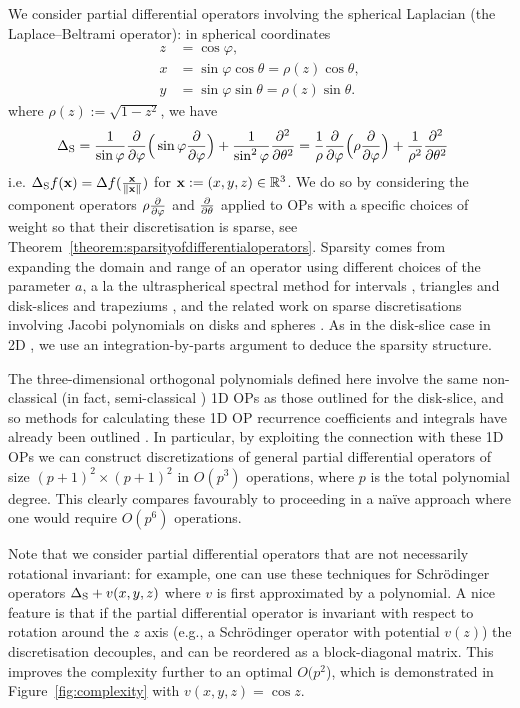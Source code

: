 \documentclass[11pt, oneside]{article}   	%
\begin{document}
We consider partial differential operators involving the spherical Laplacian (the Laplace--Beltrami operator): in spherical coordinates 
\begin{align*}
	z &= \cos\varphi, \\
	x &= \sin\varphi \cos\theta = \rho(z) \cos\theta, \\
	y &= \sin\varphi \sin\theta = \rho(z) \sin\theta.
\end{align*}
where $ \rho(z) := \sqrt{1-z^2}$, we have
\begin{align*}
	\Delta_{\rm S} &= {1 \over \sin\varphi} {\partial \over \partial \varphi} \Big( \sin\varphi {\partial \over \partial \varphi} \Big) + {1 \over \sin^2 \varphi} {\partial^2 \over \partial \theta^2} = {1 \over \rho} {\partial \over \partial \varphi} \Big( \rho {\partial \over \partial \varphi} \Big) + {1 \over \rho^2} {\partial^2 \over \partial \theta^2}
\end{align*}
i.e. $\Delta_{\rm S} f(\mathbf{x}) = \Delta f({\mathbf{x} \over \left\| \mathbf{x} \right\|})$ for $\mathbf{x} := (x,y,z) \in \mathbb{R}^3$. We do so by considering the component operators $\rho {\partial \over \partial \varphi}$ and ${\partial \over \partial \theta}$ applied to OPs with a specific choices of weight so that their discretisation is sparse, see Theorem~\ref{theorem:sparsityofdifferentialoperators}.  Sparsity comes from expanding the domain and range of an operator using different choices of the parameter $a$, a la the ultraspherical spectral method for intervals \cite{olver2013fast}, triangles \cite{olver2019triangle} and disk-slices and trapeziums \cite{snowball2019sparse}, and the related work on sparse discretisations involving Jacobi polynomials on disks \cite{vasil2016tensor} and spheres \cite{vasil2019tensor,lecoanet2019tensor}.  As in the  disk-slice case in 2D \cite{snowball2019sparse}, we use an integration-by-parts argument to deduce the sparsity structure.

 The three-dimensional orthogonal polynomials defined here involve the same non-classical (in fact, semi-classical \cite[\S5]{magnus1995painleve}) 1D OPs as those outlined for the disk-slice, and so methods for calculating these 1D OP recurrence coefficients and integrals have already been outlined \cite{snowball2019sparse}. In particular, by exploiting the connection with these 1D OPs we can construct discretizations of general partial differential operators of size $(p+1)^2 \times (p+1)^2$ in $O(p^3)$ operations, where $p$ is the total polynomial degree. This clearly compares favourably to proceeding in a na\"ive approach where one would require $O(p^6)$ operations.

Note that we consider partial differential operators that are not necessarily rotational invariant:  for example, one can use these techniques for  Schr\"odinger operators $\Delta_{\rm S} + v(x,y,z)$ where $v$ is first approximated by a polynomial. A nice feature  is that if the partial differential operator is invariant with respect to rotation around the $z$ axis (e.g., a Schr\"odinger operator with potential $v(z)$) the discretisation decouples, and can be reordered as a block-diagonal matrix. This improves the complexity further to an optimal $O(p^2$), which is demonstrated in Figure~\ref{fig:complexity} with $v(x,y,z) = \cos z$.
\end{document}
